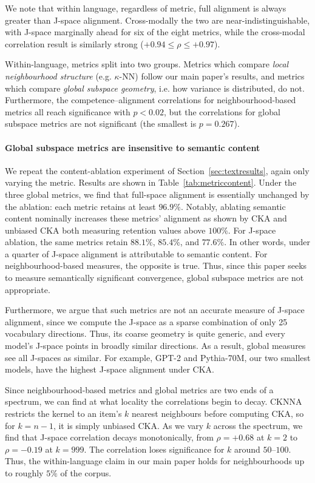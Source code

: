 \documentclass{article}
\begin{document}
We note that within language, regardless of metric, full alignment is always greater than J-space alignment. Cross-modally the two are near-indistinguishable, with J-space marginally ahead for six of the eight metrics, while the cross-modal correlation result is similarly strong ($+0.94 \leq \rho \leq +0.97$).

Within-language, metrics split into two groups. Metrics which compare \emph{local neighbourhood structure} (e.g. $\kappa$-NN) follow our main paper's results, and metrics which compare \emph{global subspace geometry}, i.e. how variance is distributed, do not. Furthermore, the competence--alignment correlations for neighbourhood-based metrics all reach significance with $p<0.02$, but the correlations for global subspace metrics are not significant (the smallest is $p=0.267$).

\paragraph{Global subspace metrics are insensitive to semantic content}
We repeat the content-ablation experiment of Section~\ref{sec:textresults}, again only varying the metric. Results are shown in Table~\ref{tab:metriccontent}. Under the three global metrics, we find that full-space alignment is essentially unchanged by the ablation: each metric retains at least $96.9\%$. Notably, ablating semantic content nominally increases these metrics' alignment as shown by CKA and unbiased CKA both measuring retention values above $100\%$. For J-space ablation, the same metrics retain $88.1\%$, $85.4\%$, and $77.6\%$. In other words, under a quarter of J-space alignment is attributable to semantic content. For neighbourhood-based measures, the opposite is true. Thus, since this paper seeks to measure semantically significant convergence, global subspace metrics are not appropriate.

Furthermore, we argue that such metrics are not an accurate measure of J-space alignment, since we compute the J-space as a sparse combination of only 25 vocabulary directions. Thus, its coarse geometry is quite generic, and every model's J-space points in broadly similar directions. As a result, global measures see all J-spaces as similar. For example, GPT-2 and Pythia-70M, our two smallest models, have the highest J-space alignment under CKA. 

Since neighbourhood-based metrics and global metrics are two ends of a spectrum, we can find at what locality the correlations begin to decay. CKNNA restricts the kernel to an item's $k$ nearest neighbours before computing CKA, so for $k=n-1$, it is simply unbiased CKA. As we vary $k$ across the spectrum, we find that J-space correlation decays monotonically, from $\rho = +0.68$ at $k=2$ to $\rho = -0.19$ at $k=999$. The correlation loses significance for $k$ around $50$--$100$. Thus, the within-language claim in our main paper holds for
neighbourhoods up to roughly $5\%$ of the corpus.
\end{document}
